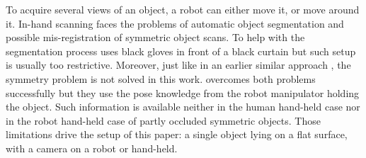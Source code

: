 \documentclass[letterpaper, 10 pt, conference]{ieeeconf}  %
\begin{document}
To acquire several views of an object, a robot can either move it, or move around it. In-hand scanning faces the problems
of automatic object segmentation and possible mis-registration of symmetric object scans. To help with the segmentation process
\cite{weise2011online} uses black gloves in front of a black curtain but such setup is usually too restrictive.
Moreover, just like in an earlier similar approach \cite{rusinkiewicz2002real}, the symmetry problem is not solved in this work.
\cite{krainin2011manipulator} overcomes both problems successfully but
they use the pose knowledge from the robot manipulator holding the object.
Such information is available neither in the human hand-held case 
nor in the robot hand-held case of partly occluded symmetric objects.
Those limitations drive the setup of this paper: a single object lying on a flat surface,
with a camera on a robot or hand-held.
\end{document}
